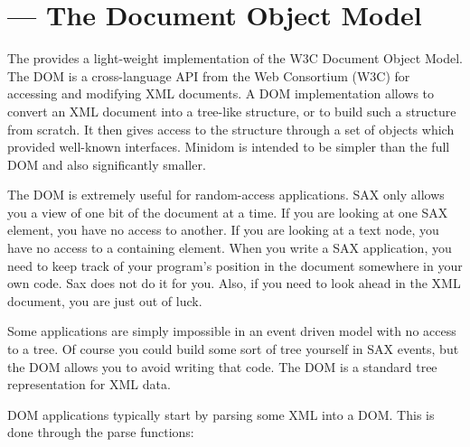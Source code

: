\section{ ---
         The Document Object Model}



The  provides a light-weight implementation of
the W3C Document Object Model. The DOM is a cross-language API from
the Web Consortium (W3C) for accessing and modifying XML documents. A
DOM implementation allows to convert an XML document into a tree-like
structure, or to build such a structure from scratch.  It then gives
access to the structure through a set of objects which provided
well-known interfaces. Minidom is intended to be simpler than the full
DOM and also significantly smaller.

The DOM is extremely useful for random-access applications. SAX only
allows you a view of one bit of the document at a time. If you are
looking at one SAX element, you have no access to another. If you are
looking at a text node, you have no access to a containing
element. When you write a SAX application, you need to keep track of
your program's position in the document somewhere in your own
code. Sax does not do it for you. Also, if you need to look ahead in
the XML document, you are just out of luck.

Some applications are simply impossible in an event driven model with
no access to a tree. Of course you could build some sort of tree
yourself in SAX events, but the DOM allows you to avoid writing that
code. The DOM is a standard tree representation for XML data.


DOM applications typically start by parsing some XML into a DOM. This
is done through the parse functions:


